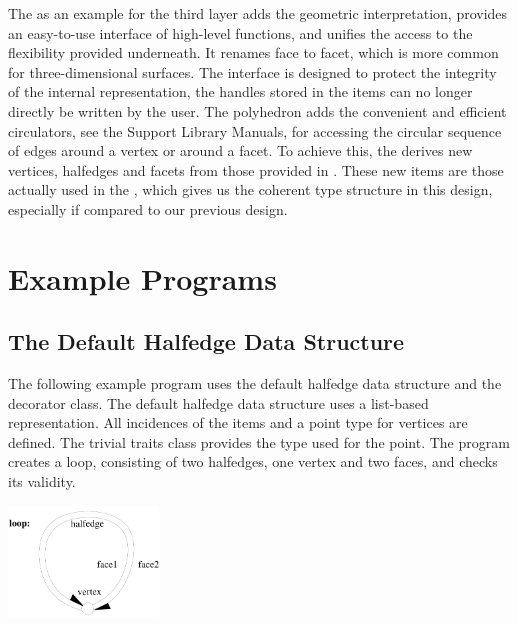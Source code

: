 The  as an example for the third layer adds the
geometric interpretation, provides an easy-to-use interface of
high-level functions, and unifies the access to the flexibility
provided underneath.  It renames face to facet, which is more common
for three-dimensional surfaces.  The interface is designed to protect
the integrity of the internal representation, the handles stored in
the items can no longer directly be written by the user.  The
polyhedron adds the convenient and efficient circulators, see the
Support Library Manuals, for accessing the circular sequence of edges
around a vertex or around a facet. To achieve this, the
 derives new vertices, halfedges and facets from those
provided in .  These new items are those actually used in
the , which gives us the coherent type
structure in this design, especially if compared to our previous
design.


\section{Example Programs}
\label{sectionHdsExamples}


\subsection{The Default Halfedge Data Structure}

The following example program uses the default halfedge data structure
and the decorator class. The default halfedge data structure uses a
list-based representation. All incidences of the items and a point
type for vertices are defined. The trivial traits class provides the
type used for the point. The program creates a loop, consisting
of two halfedges, one vertex and two faces, and checks its validity.

\begin{ccTexOnly}
    \vspace{-4mm}
    \begin{center}
      \parbox{0.3\textwidth}{%
          \includegraphics[width=0.3\textwidth]{HalfedgeDS/fig/loop}%
      }
    \end{center}
    \vspace{-3mm}
\end{ccTexOnly}

